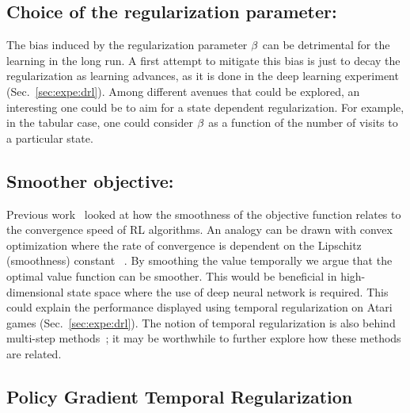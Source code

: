 \subsection{Choice of the regularization parameter:}

The bias induced by the regularization parameter $\beta$ can be detrimental for the learning in the long run. A first attempt to mitigate this bias is just to decay the regularization as learning advances, as it is done in the deep learning experiment (Sec.~\ref{sec:expe:drl}). Among different avenues that could be explored, an interesting one could be to aim for a state dependent regularization. For example, in the tabular case, one could consider $\beta$ as a function of the number of visits to a particular state.
\subsection{Smoother objective:}

Previous work~\cite{smooth_value} looked at how the smoothness of the objective function relates to the convergence speed of RL algorithms.  An analogy can be drawn with convex optimization where the rate of convergence is dependent on the Lipschitz (smoothness) constant ~\cite{boyd2004convex}. 
By smoothing the value temporally we argue that the optimal value function can be smoother. This would be beneficial in high-dimensional state space where the use of deep neural network is required. This could explain the performance displayed using temporal regularization on Atari games (Sec.~\ref{sec:expe:drl}).
The notion of temporal regularization is also behind multi-step methods~\cite{sutton1998reinforcement}; it may be worthwhile to further explore how these methods are related.

\subsection{Policy Gradient Temporal Regularization}

